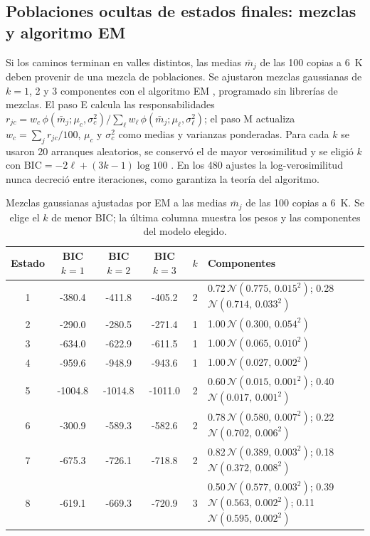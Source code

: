 \subsection{Poblaciones ocultas de estados finales: mezclas y algoritmo EM}

Si los caminos terminan en valles distintos, las medias $\bar m_j$ de las 100 copias a 6~K deben provenir de una mezcla de poblaciones. Se ajustaron mezclas gaussianas de $k=1$, 2 y 3 componentes con el algoritmo EM \citep{dempster1977}, programado sin librerías de mezclas. El paso E calcula las responsabilidades $r_{jc}=w_c\,\phi(\bar m_j;\mu_c,\sigma_c^2)/\sum_\ell w_\ell\,\phi(\bar m_j;\mu_\ell,\sigma_\ell^2)$; el paso M actualiza $w_c=\sum_jr_{jc}/100$, $\mu_c$ y $\sigma_c^2$ como medias y varianzas ponderadas. Para cada $k$ se usaron 20 arranques aleatorios, se conservó el de mayor verosimilitud y se eligió $k$ con $\mathrm{BIC}=-2\ell+(3k-1)\log100$ \citep{schwarz1978}. En los 480 ajustes la log-verosimilitud nunca decreció entre iteraciones, como garantiza la teoría del algoritmo.

\begin{table}[H]
\centering\small
\caption{Mezclas gaussianas ajustadas por EM a las medias $\bar m_j$ de las 100 copias a 6~K. Se elige el $k$ de menor BIC; la última columna muestra los pesos y las componentes del modelo elegido.}
\label{tab:em}
\footnotesize\setlength{\tabcolsep}{4pt}
\begin{tabular}{cccccp{8.2cm}}
\toprule
Estado & BIC $k=1$ & BIC $k=2$ & BIC $k=3$ & $k$ & Componentes\\
\midrule
1 & -380.4 & -411.8 & -405.2 & 2 & 0.72\,$\mathcal N(0.775,\,0.015^2)$; 0.28\,$\mathcal N(0.714,\,0.033^2)$ \\
2 & -290.0 & -280.5 & -271.4 & 1 & 1.00\,$\mathcal N(0.300,\,0.054^2)$ \\
3 & -634.0 & -622.9 & -611.5 & 1 & 1.00\,$\mathcal N(0.065,\,0.010^2)$ \\
4 & -959.6 & -948.9 & -943.6 & 1 & 1.00\,$\mathcal N(0.027,\,0.002^2)$ \\
5 & -1004.8 & -1014.8 & -1011.0 & 2 & 0.60\,$\mathcal N(0.015,\,0.001^2)$; 0.40\,$\mathcal N(0.017,\,0.001^2)$ \\
6 & -300.9 & -589.3 & -582.6 & 2 & 0.78\,$\mathcal N(0.580,\,0.007^2)$; 0.22\,$\mathcal N(0.702,\,0.006^2)$ \\
7 & -675.3 & -726.1 & -718.8 & 2 & 0.82\,$\mathcal N(0.389,\,0.003^2)$; 0.18\,$\mathcal N(0.372,\,0.008^2)$ \\
8 & -619.1 & -669.3 & -720.9 & 3 & 0.50\,$\mathcal N(0.577,\,0.003^2)$; 0.39\,$\mathcal N(0.563,\,0.002^2)$; 0.11\,$\mathcal N(0.595,\,0.002^2)$ \\
\bottomrule
\end{tabular}
\end{table}

